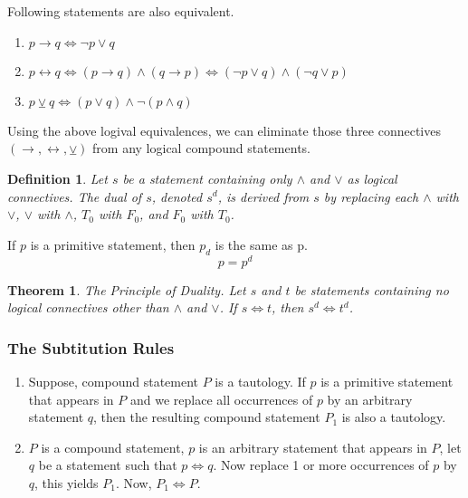 \documentclass[12pt]{article}
\newtheorem{definition}{Definition} [section]
\newtheorem{theorem}{Theorem} [section]
\begin{document}
\\ \\
Following statements are also equivalent.
\begin {enumerate}
\item $p \rightarrow q \Leftrightarrow \neg p \vee q$
\item $p \leftrightarrow q \Leftrightarrow (p \rightarrow q) \wedge (q \rightarrow p) \Leftrightarrow (\neg p \vee q) \wedge (\neg q \vee p)$
\item $p \veebar q \Leftrightarrow (p \vee q) \wedge \neg (p \wedge q)$
\end{enumerate}
Using the above logival equivalences, we can eliminate those three connectives$(\rightarrow, \leftrightarrow, \veebar)$ from any logical compound statements.
\pagebreak
\begin{definition}
\emph{Let $s$ be a statement containing only $\wedge$ and $\vee$ as logical connectives. The dual of $s$, denoted $s^d$, is derived from $s$ by replacing each $\wedge$ with $\vee$, $\vee$ with $\wedge$, $T_0$ with $F_0$, and $F_0$ with $T_0$.}
\end{definition}
\noindent If $p$ is a primitive statement, then $p_d$ is the same as p.
\[
p = p^d
\]
\begin{theorem}
The Principle of Duality. \emph{Let $s$ and $t$ be statements containing no logical connectives other than $\wedge$ and $\vee$. If $s \Leftrightarrow t$, then $s^d \Leftrightarrow t^d$}.
\end{theorem}
\subsubsection{The Subtitution Rules}
\begin{enumerate}
\item Suppose, compound statement $P$ is a tautology. If $p$ is a primitive statement that appears in $P$ and we replace all occurrences of $p$ by an arbitrary statement $q$, then the resulting compound statement $P_1$ is also a tautology.
\item $P$ is a compound statement, $p$ is an arbitrary statement that appears in $P$, let $q$ be a statement such that $p \Leftrightarrow q$. Now replace 1 or more occurrences of $p$ by $q$, this yields $P_1$. Now, $P_1 \Leftrightarrow P$.
\end{enumerate}
\end{document}
